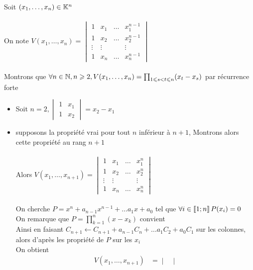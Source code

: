 \begin{dem}
    Soit \((x_1, \dots  , x_n) \in  \mathbb{K}^n\)\\~\\
    On note \(V(x_1, \dots,x_n) =  \begin{vmatrix}
            1 & x_1 & \dots & x^{n-1}_1\\
            1 & x_2 & \dots & x^{n-1}_2\\
            \vdots & \vdots &&\vdots \\
            1 & x_n &\dots & x^{n-1}_n 
            \end{vmatrix} \)\\~\\
    Montrons que \(\forall n \in \mathbb{N}, n \geqslant 2,V(x_1, \dots,x_n)  =\prod_{1\leqslant s<t\leqslant n}(x_t - x_s) \) par récurrence forte
    \begin{itemize}
        \item Soit \(n = 2,\begin{vmatrix}
            1 & x_1 \\
            1 & x_2
        \end{vmatrix} = x_2-x_1\)
        \item supposons la propriété vrai pour tout \(n\) inférieur à \(n+1\), Montrons alors cette propriété au rang \(n+1\)\\~\\
        Alors \(V(x_1, \dots,x_{n+1}) =  \begin{vmatrix}
            1 & x_1 & \dots & x^{n}_1\\
            1 & x_2 & \dots & x^{n}_2\\
            \vdots & \vdots &&\vdots \\
            1 & x_n &\dots & x^{n}_n 
            \end{vmatrix} \)\\~\\
            On cherche \(P = x^n + a_{n-1}x^{n-1} + \dots a_1 x + a_0\) tel que \(\forall i \in \left\llbracket1;n\right\rrbracket P(x_i) = 0\)\\
            On remarque que \(P = \prod_{k=1}^n (x-x_k)\) convient \\
            Ainsi en faisant \(C_{n+1} \leftarrow C_{n+1} + a_{n-1}C_n + \dots a_1 C_2 + a_0 C_1\) sur les colonnes, alors d'après les propriété de \(P\) sur les \(x_i\) \\
            On obtient \begin{align*}
            V(x_1, \dots,x_{n+1}) &=  \begin{vmatrix}

\end{vmatrix}
\end{align*}
\end{itemize}
\end{dem}
